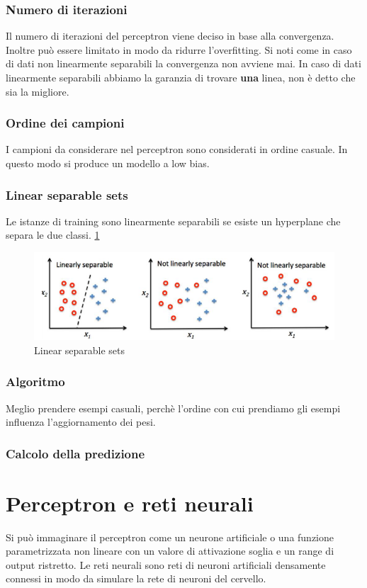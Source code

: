 		\subsubsection{Numero di iterazioni}
		Il numero di iterazioni del perceptron viene deciso in base alla convergenza.
		Inoltre pu\`o essere limitato in modo da ridurre l'overfitting.
		Si noti come in caso di dati non linearmente separabili la convergenza non avviene mai. In caso di dati linearmente separabili abbiamo la garanzia di trovare \textbf{una} linea, non è detto che sia la migliore.

		\subsubsection{Ordine dei campioni}
		I campioni da considerare nel perceptron sono considerati in ordine casuale.
		In questo modo si produce un modello a low bias.

		\subsubsection{Linear separable sets}
		Le istanze di training sono linearmente separabili se esiste un hyperplane che separa le due classi. \ref{fig:chapter04-01}
		\begin{figure}
			\centering
			\includegraphics[width=0.6\linewidth]{imgs/chapter4/img1}
			\caption{Linear separable sets}
			\label{fig:chapter04-01}
		\end{figure}

		\subsubsection{Algoritmo}
		
		
		Meglio prendere esempi casuali, perch\`e l'ordine con cui prendiamo gli esempi influenza l'aggiornamento dei pesi.

		\subsubsection{Calcolo della predizione}
		

\section{Perceptron e reti neurali}
Si pu\`o immaginare il perceptron come un neurone artificiale o una funzione parametrizzata non lineare con un valore di attivazione soglia e un range di output ristretto.
Le reti neurali sono reti di neuroni artificiali densamente connessi in modo da simulare la rete di neuroni del cervello.

